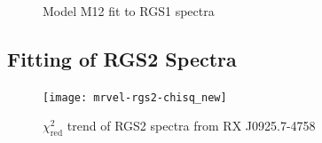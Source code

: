 			\newpage
			\begin{figure}[h!]
				\centering
				 \hfill
				\caption{Model M12 fit to RGS1 spectra}
				\label{xmm:rgs1-m12}
			\end{figure}
		
		\subsection{Fitting of RGS2 Spectra} \label{hi-resolution:analysis:rgs2}
		
			\begin{figure}[h!]
				\centering
				\texttt{[image: mrvel-rgs2-chisq\_new]}
				\caption{$\chi^2_\text{red}$ trend of RGS2 spectra from RX J0925.7-4758}
				\label{fig:mrvel-rgs2-chisq}
			\end{figure}
			
